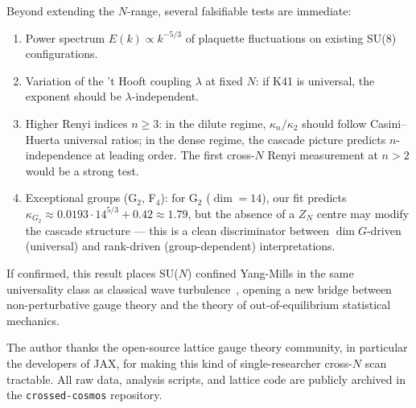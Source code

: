 \documentclass[aps,prl,reprint,nofootinbib,floatfix]{revtex4-2}
\begin{document}
Beyond extending the $N$-range, several falsifiable tests are immediate:
\begin{enumerate}
\item Power spectrum $E(k) \propto k^{-5/3}$ of plaquette fluctuations on existing SU($8$) configurations.
\item Variation of the 't Hooft coupling $\lambda$ at fixed $N$: if K41 is universal, the exponent should be $\lambda$-independent.
\item Higher Renyi indices $n\ge 3$: in the dilute regime, $\kappa_n / \kappa_2$ should follow Casini--Huerta universal ratios; in the dense regime, the cascade picture predicts $n$-independence at leading order. The first cross-$N$ Renyi measurement at $n>2$ would be a strong test.
\item Exceptional groups (G$_2$, F$_4$): for G$_2$ ($\dim = 14$), our fit predicts $\kappa_{G_2} \approx 0.0193\cdot 14^{5/3} + 0.42 \approx 1.79$, but the absence of a $Z_N$ centre may modify the cascade structure --- this is a clean discriminator between $\dim G$-driven (universal) and rank-driven (group-dependent) interpretations.
\end{enumerate}

If confirmed, this result places SU($N$) confined Yang-Mills in the same universality class as classical wave turbulence~\cite{ZakharovLN}, opening a new bridge between non-perturbative gauge theory and the theory of out-of-equilibrium statistical mechanics.

\begin{acknowledgments}
The author thanks the open-source lattice gauge theory community, in particular the developers of JAX, for making this kind of single-researcher cross-$N$ scan tractable. All raw data, analysis scripts, and lattice code are publicly archived in the \texttt{crossed-cosmos} repository.
\end{acknowledgments}
\end{document}
